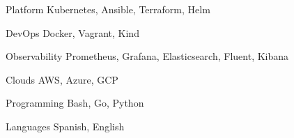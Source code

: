 

\begin{cvskills}

  \cvskill
    {Platform} %
    {Kubernetes, Ansible, Terraform, Helm} %

  \cvskill
    {DevOps} %
    {Docker, Vagrant, Kind} %

  \cvskill
    {Observability} %
    {Prometheus, Grafana, Elasticsearch, Fluent, Kibana} %

  \cvskill
    {Clouds} %
    {AWS, Azure, GCP} %

  \cvskill
    {Programming} %
    {Bash, Go, Python} %

  \cvskill
    {Languages} %
    {Spanish, English} %

\end{cvskills}
